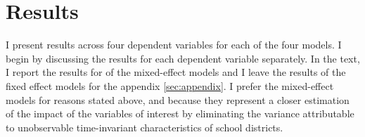 %

\section{Results}

I present results across four dependent variables for each of the four models. I begin by 
discussing the results for each dependent variable separately. In the text, I 
report the results for of the mixed-effect models and I leave the results of the 
fixed effect models for the appendix \ref{sec:appendix}. I prefer the mixed-effect 
models for reasons stated above, and because they represent a closer estimation 
of the impact of the variables of interest by eliminating the variance attributable 
to unobservable time-invariant characteristics of school districts. 

